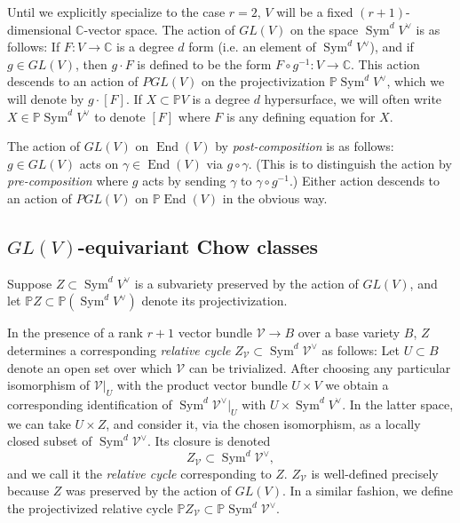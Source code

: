 \documentclass[12 pt, reqno]{amsart}
\theoremstyle{definition}
\newcommand{\on}{\operatorname}
\newcommand{\mb}{\mathbb}
\renewcommand{\P}{\mb{P}}
\renewcommand{\k}{\mathbb{C}}
\begin{document}
Until we explicitly specialize to the case $r=2$, $V$ will be a fixed
$(r+1)$-dimensional $\k$-vector space.  The action of $GL(V)$ on the
space $\on{Sym}^{d}V^{\vee}$ is as follows: If $F: V \to \k$ is a
degree $d$ form (i.e. an element of $\on{Sym}^{d}V^{\vee}$), and if
$g\in GL(V)$, then $g \cdot F$ is defined to be the form
$F \circ g^{-1}: V \to \k$.  This action descends to an action of
$PGL(V)$ on the projectivization $\P \on{Sym}^{d}V^{\vee}$, which we
will denote by $g \cdot [F]$.  If $X \subset \P V$ is a degree $d$
hypersurface, we will often write $X \in \P \on{Sym}^{d}V^{\vee}$ to
denote $[F]$ where $F$ is any defining equation for $X$.



The action of $GL(V)$ on $\on{End}(V)$ by {\sl post-composition} is as
follows: $g \in GL(V)$ acts on $\gamma \in \on{End}(V)$ via
$ g \circ \gamma$.  (This is to distinguish the action by {\sl
  pre-composition} where $g$ acts by sending $\gamma$ to
$\gamma \circ g^{-1}$.)  Either action descends to an action of
$PGL(V)$ on $\P \on{End}(V)$ in the obvious way.

\subsection{$GL(V)$-equivariant Chow classes}
Suppose $Z \subset \on{Sym}^dV^{\vee}$ is a subvariety preserved by
the action of $GL(V)$, and let
$\P Z \subset \mb{P}(\on{Sym}^dV^{\vee})$ denote its projectivization.

In the presence of a rank $r+1$ vector bundle $\mathcal{V} \to B$ over
a base variety $B$, $Z$ determines a corresponding {\sl relative
  cycle} $Z_{\mathcal{V}} \subset \on{Sym}^d\mathcal{V}^{\vee}$ as
follows: Let $U \subset B$ denote an open set over which $\mathcal{V}$
can be trivialized.  After choosing any particular isomorphism of
$\mathcal{V}|_{U}$ with the product vector bundle $U \times V$ we
obtain a corresponding identification of
$\on{Sym}^d\mathcal{V}^{\vee}|_{U}$ with
$U \times \on{Sym}^dV^{\vee}$. In the latter space, we can take
$U \times Z$, and consider it, via the chosen isomorphism, as a
locally closed subset of $\on{Sym}^d\mathcal{V}^{\vee}$.  Its closure
is denoted $$Z_{\mathcal{V}} \subset \on{Sym}^d\mathcal{V}^{\vee},$$
and we call it the {\sl relative cycle} corresponding to $Z$.
$Z_{\mathcal{V}}$ is well-defined precisely because $Z$ was preserved
by the action of $GL(V)$. In a similar fashion, we define the
projectivized relative cycle
$\P Z_{\mathcal{V}} \subset \P \on{Sym}^d\mathcal{V}^{\vee}$.
\end{document}
